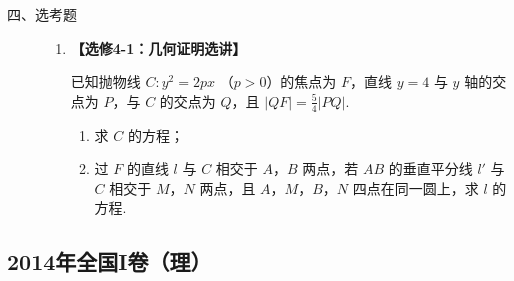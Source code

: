 \begin{description}

    \item[四、选考题]

    \begin{enumerate}[leftmargin=5pt]

      \addtocounter{enumi}{+21}

        \item \textbf{【选修4-1：几何证明选讲】}

已知抛物线 \(C: y^{2} = 2px \) （\(p > 0\)）的焦点为 \(F\)，直线 \(y = 4\) 与 \(y\) 轴的交点为 \(P\)，与 \(C\) 的交点为 \(Q\)，且 \(|QF| = \frac{5}{4} |PQ|\).

\begin{enumerate}
\item 求 \(C\) 的方程；
\item 过 \(F\) 的直线 \(l\) 与 \(C\) 相交于 \(A\)，\(B\) 两点，若 \(AB\) 的垂直平分线 \(l'\) 与 \(C\) 相交于 \(M\)，\(N\) 两点，且 \(A\)，\(M\)，\(B\)，\(N\) 四点在同一圆上，求 \(l\) 的方程.
\end{enumerate}

    \end{enumerate}

\end{description}


\subsection{2014年全国I卷（理）}\label{gk:2014年全国I卷（理）}

